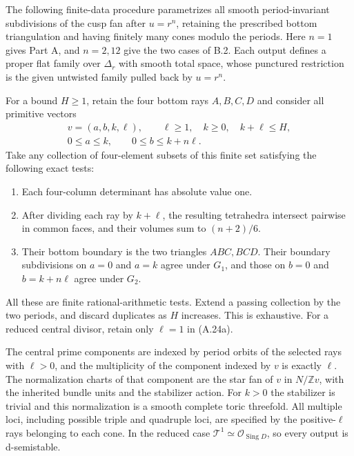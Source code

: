 \begin{theorem}\label{push:A24}
The following finite-data procedure parametrizes all smooth
period-invariant subdivisions of the cusp fan after
$u=r^n$, retaining the prescribed bottom triangulation and
having finitely many cones modulo the periods. Here $n=1$
gives Part A, and $n=2,12$ give the two cases of B.2.
Each output defines a proper flat family over $\Delta_r$
with smooth total space, whose punctured restriction is the
given untwisted family pulled back by $u=r^n$.

For a bound $H\geq1$, retain the four bottom rays
$A,B,C,D$ and consider all primitive vectors
\[
 \begin{gathered}
 v=(a,b,k,\ell),\qquad
 \ell\geq1,\quad k\geq0,\quad k+\ell\leq H,\\
 0\leq a\leq k,\qquad0\leq b\leq k+n\ell.
 \end{gathered}
 \tag{A.24a}
\]
Take any collection of four-element subsets of this finite
set satisfying the following exact tests:
\begin{enumerate}
\item Each four-column determinant has absolute value one.
\item After dividing each ray by $k+\ell$, the resulting
tetrahedra intersect pairwise in common faces, and their
volumes sum to $(n+2)/6$.
\item Their bottom boundary is the two triangles $ABC,BCD$.
Their boundary subdivisions on $a=0$ and $a=k$ agree under
$G_1$, and those on $b=0$ and $b=k+n\ell$ agree under $G_2$.
\end{enumerate}
All these are finite rational-arithmetic tests. Extend a
passing collection by the two periods, and discard duplicates
as $H$ increases. This is exhaustive. For a reduced central
divisor, retain only $\ell=1$ in (A.24a).

The central prime components are indexed by period orbits of
the selected rays with $\ell>0$, and the multiplicity of the
component indexed by $v$ is exactly $\ell$. The normalization
charts of that component are the star fan of $v$ in
$N/\mathbb Zv$, with the inherited bundle units and the
stabilizer action. For $k>0$ the stabilizer is trivial and this
normalization is a smooth complete toric threefold. All
multiple loci, including possible triple and quadruple loci,
are specified by the positive-$\ell$ rays belonging to each
cone. In the reduced case
$\mathcal T^1\simeq\mathcal O_{\operatorname{Sing}D}$,
so every output is d-semistable.
\end{theorem}
